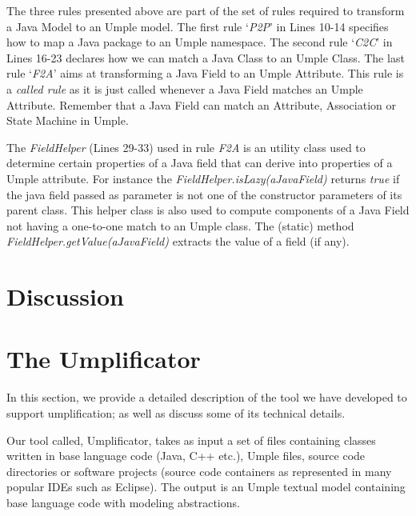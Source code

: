 
The three rules presented above are part of the set of rules required to transform a Java Model to an Umple model.  The first rule `\textit{P2P}' in Lines 10-14  specifies how to map a Java package to an Umple namespace. The second rule `\textit{C2C}' in Lines 16-23 declares how we can match a Java Class to an Umple Class. The last rule `\textit{F2A}' aims at transforming a Java Field to an Umple Attribute. This rule is a \textit{called rule} as it is just called whenever a Java Field matches an Umple Attribute. Remember that a Java Field can match an Attribute, Association or State Machine in Umple.

The \textit{FieldHelper} (Lines 29-33) used in rule \textit{F2A} is an utility class used to determine certain properties of a Java field that can derive into properties of a Umple attribute. For instance the \textit{FieldHelper.isLazy(aJavaField)} returns \textit{true} if the java field passed as parameter is not one of the constructor parameters of its parent class. This helper class is also used to compute components of a Java Field not having a one-to-one match to an Umple class. The (static) method \textit{FieldHelper.getValue(aJavaField)} extracts the value of a field (if any). 

\section{Discussion}



\section{The Umplificator}
\label{chap:tool}
In this section, we provide a detailed description of the tool we have developed to support umplification; as well as discuss some of its technical details.

Our tool called, Umplificator, takes as input  a set of files containing classes written in base language code (Java, C++ etc.), Umple files, source code directories or software projects (source code containers as represented in many popular IDEs such as Eclipse). The output is an Umple textual model containing base language code with modeling abstractions. 

